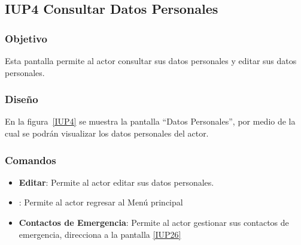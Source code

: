 \subsection{IUP4 Consultar Datos Personales}
 
\subsubsection{Objetivo}

    Esta pantalla permite al actor consultar sus datos personales y editar sus datos personales.

\subsubsection{Diseño}

    En la figura~\ref{IUP4} se muestra la pantalla ``Datos Personales'', por medio de la cual se podrán visualizar los datos personales del actor. \\


\subsubsection{Comandos}
\begin{itemize}
    \item \textbf{Editar}: Permite al actor editar sus datos personales.
    \item {}: Permite al actor regresar al Menú principal
    \item \textbf{Contactos de Emergencia}: Permite al actor gestionar sus contactos de emergencia, direcciona a la pantalla \ref{IUP26}
\end{itemize}

%
